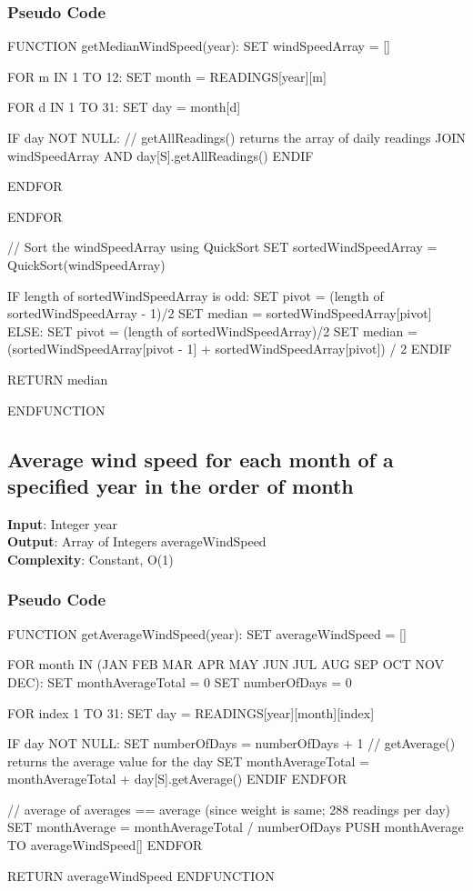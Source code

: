 \documentclass[12pt]{article}
\begin{document}
\subsubsection{Pseudo Code}
\begin{algorithm}[caption={Find median wind speed in a given year}, label=algo2]
	FUNCTION getMedianWindSpeed(year):
	SET windSpeedArray = []
	
	FOR m IN 1 TO 12:
	SET month = READINGS[year][m]
	
	FOR d IN 1 TO 31:
	SET day = month[d]
	
	IF day NOT NULL:
	// getAllReadings() returns the array of daily readings
	JOIN windSpeedArray AND day[S].getAllReadings()
	ENDIF
	
	ENDFOR
	
	ENDFOR
	
	// Sort the windSpeedArray using QuickSort
	SET sortedWindSpeedArray = QuickSort(windSpeedArray)
	
	IF length of sortedWindSpeedArray is odd:
	SET pivot = (length of sortedWindSpeedArray - 1)/2
	SET median = sortedWindSpeedArray[pivot]
	ELSE:
	SET pivot = (length of sortedWindSpeedArray)/2
	SET median = (sortedWindSpeedArray[pivot - 1] + sortedWindSpeedArray[pivot]) / 2
	ENDIF
	
	RETURN median
	
	ENDFUNCTION
\end{algorithm}
\subsection{Average wind speed for each month of a specified year in the order of month}
\textbf{Input}: Integer year \\
\textbf{Output}: Array of Integers averageWindSpeed \\
\textbf{Complexity}: Constant, O(1)
\subsubsection{Pseudo Code}
\begin{algorithm}[caption={Find average wind speed per month for a given year and return values in the order of month}, label=algo3]
	FUNCTION getAverageWindSpeed(year):
	SET averageWindSpeed = []
	
	FOR month IN (JAN FEB MAR APR MAY JUN JUL AUG SEP OCT NOV DEC):
	SET monthAverageTotal = 0
	SET numberOfDays = 0
	
	FOR index 1 TO 31:
	SET day = READINGS[year][month][index]
	
	IF day NOT NULL:
	SET numberOfDays = numberOfDays + 1
	// getAverage() returns the average value for the day
	SET monthAverageTotal = monthAverageTotal + day[S].getAverage()
	ENDIF
	ENDFOR
	
	// average of averages == average (since weight is same; 288 readings per day)
	SET monthAverage = monthAverageTotal / numberOfDays
	PUSH monthAverage TO averageWindSpeed[]
	ENDFOR
	
	RETURN averageWindSpeed
	ENDFUNCTION
\end{algorithm}
\end{document}
